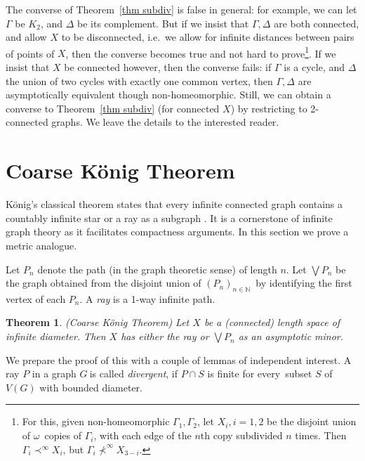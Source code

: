 \documentclass[a4paper]{article}
\newcommand{\defi}[1]{{\color{darkgray}\emph{#1}}}
\newtheorem{theorem}[proposition]{Theorem}
\newcommand{\N}{\ensuremath{\mathbb N}}
\newcommand{\oo}{\ensuremath{\omega}}
\newcommand{\seq}[1]{\ensuremath{(#1_n)_{n\in\N}}}
\newcommand{\g}{\ensuremath{G\ }}
\newcommand{\Tr}[1]{Theorem~\ref{#1}}
\newcommand{\fe}{for every}
\newcommand{\asm}[2]{\ensuremath{#1 \prec^\infty #2}}
\newcommand{\nasm}[2]{\ensuremath{#1 \not \prec^\infty #2}}
\begin{document}
The converse of \Tr{thm subdiv} is false in general: for example, we can let $\Gamma$ be $K_2$, and $\Delta$ be its complement. But if we insist that $\Gamma,\Delta$ are both connected, and allow $X$ to be disconnected, i.e.\ we allow for infinite distances between pairs of points of $X$, then the converse becomes true and not hard to prove\footnote{For this, given non-homeomorphic $\Gamma_1,\Gamma_2$, let $X_i, i=1,2$ be the disjoint union of \oo\ copies of $\Gamma_i$, with each edge of the $n$th copy subdivided $n$ times. Then  $\asm{\Gamma_i}{X_i}$, but $\nasm{\Gamma_i}{X_{3-i}}$.}. If we insist that $X$ be connected however, then the converse fails: if $\Gamma$ is a cycle, and $\Delta$ the union of two cycles with exactly one common vertex, then $\Gamma,\Delta$ are asymptotically equivalent though non-homeomorphic. 
Still, we can obtain a converse to \Tr{thm subdiv} (for connected $X$) by restricting to 2-connected graphs. We leave the details to the interested reader.





\section{Coarse K\"onig Theorem} \label{sec Konig}
K\"onig's classical theorem states that every infinite connected graph contains a countably infinite star or a ray as a subgraph \cite[Proposition 8.2.1.]{DiestelBook05}. It is a cornerstone of infinite graph theory as it facilitates compactness arguments. In this section we prove a metric analogue. 
\smallskip

Let $P_n$ denote the path (in the graph theoretic sense) of length $n$. Let $\bigvee P_n$ be the graph obtained from the disjoint union of \seq{P}\ by identifying the first vertex of each $P_n$. A \defi{ray} is a 1-way infinite path. 


\begin{theorem} \label{thm Konig}
(Coarse K\"onig Theorem) Let $X$ be a (connected) length space of infinite diameter. Then $X$ has either the ray or $\bigvee P_n$ as an asymptotic minor.
\end{theorem}

We prepare the proof of this with a couple of lemmas of independent interest. A ray $P$ in a graph \g is called \defi{divergent}, if $P\cap S$ is finite \fe\ subset $S$ of $V(G)$ with bounded diameter. 
\end{document}

